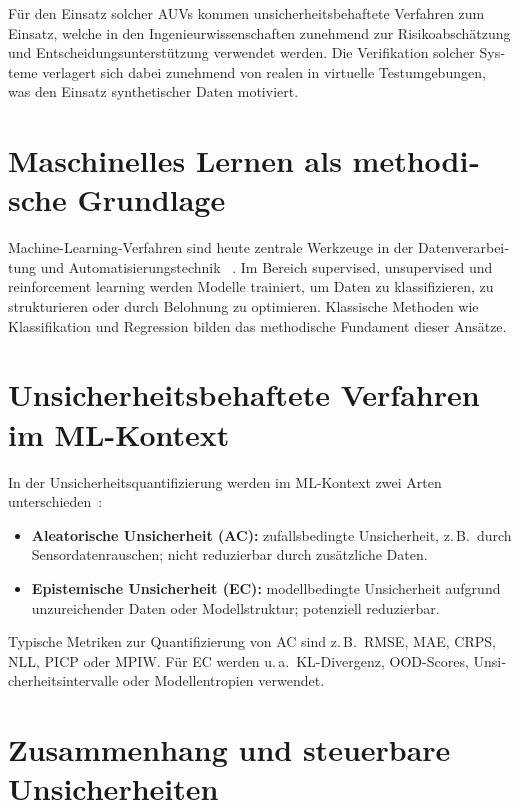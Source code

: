 \begin{otherlanguage}{ngerman}
Für den Einsatz solcher AUVs kommen unsicherheitsbehaftete Verfahren zum Einsatz, welche in den Ingenieurwissenschaften zunehmend zur Risikoabschätzung und Entscheidungsunterstützung verwendet werden. Die Verifikation solcher Systeme verlagert sich dabei zunehmend von realen in virtuelle Testumgebungen, was den Einsatz synthetischer Daten motiviert.


\section{Maschinelles Lernen als methodische Grundlage}

Machine-Learning-Verfahren sind heute zentrale Werkzeuge in der Datenverarbeitung und Automatisierungstechnik ~\parencite{Nof2023}. Im Bereich supervised, unsupervised und reinforcement learning werden Modelle trainiert, um Daten zu klassifizieren, zu strukturieren oder durch Belohnung zu optimieren. Klassische Methoden wie Klassifikation und Regression bilden das methodische Fundament dieser Ansätze.

\section{Unsicherheitsbehaftete Verfahren im ML-Kontext}

In der Unsicherheitsquantifizierung werden im ML-Kontext zwei Arten unterschieden~\parencite{Hullermeier2021}:

\begin{itemize}
  \item \textbf{Aleatorische Unsicherheit (AC):} zufallsbedingte Unsicherheit, z.\,B.\ durch Sensordatenrauschen; nicht reduzierbar durch zusätzliche Daten.
  \item \textbf{Epistemische Unsicherheit (EC):} modellbedingte Unsicherheit aufgrund unzureichender Daten oder Modellstruktur; potenziell reduzierbar.
\end{itemize}

\noindent
Typische Metriken zur Quantifizierung von AC sind z.\,B.\ RMSE, MAE, CRPS, NLL, PICP oder MPIW. Für EC werden u.\,a.\ KL-Divergenz, OOD-Scores, Unsicherheitsintervalle oder Modellentropien verwendet.

\section{Zusammenhang und steuerbare Unsicherheiten}


\end{otherlanguage}
